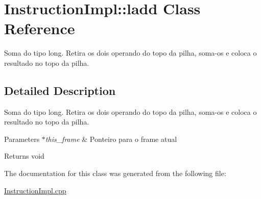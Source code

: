 \hypertarget{class_instruction_impl_1_1ladd}{}\section{Instruction\+Impl\+:\+:ladd Class Reference}
\label{class_instruction_impl_1_1ladd}


Soma do tipo long. Retira os dois operando do topo da pilha, soma-\/os e coloca o resultado no topo da pilha.  




\subsection{Detailed Description}
Soma do tipo long. Retira os dois operando do topo da pilha, soma-\/os e coloca o resultado no topo da pilha. 


\begin{DoxyParams}{Parameters}
{\em $\ast$this\+\_\+frame} & Ponteiro para o frame atual \\
\hline
\end{DoxyParams}
\begin{DoxyReturn}{Returns}
void 
\end{DoxyReturn}


The documentation for this class was generated from the following file\+:\begin{DoxyCompactItemize}
\item 
\hyperlink{_instruction_impl_8cpp}{Instruction\+Impl.\+cpp}\end{DoxyCompactItemize}

